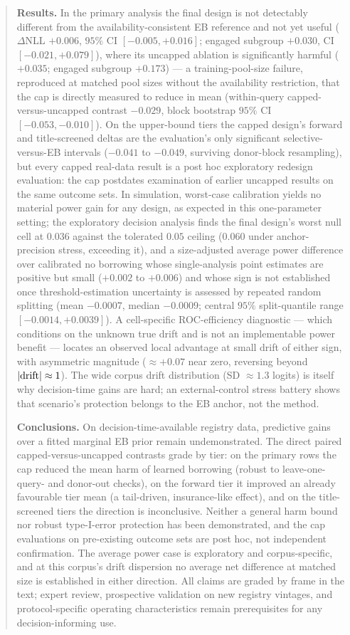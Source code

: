 \documentclass[11pt]{article}
\begin{document}
\begin{abstract}
\noindent\textbf{Results.} In the primary analysis the final design is
not detectably different from the availability-consistent EB reference
and not yet useful ($\Delta$NLL $+0.006$, $95\%$ CI
$[-0.005,+0.016]$; engaged subgroup $+0.030$, CI $[-0.021,+0.079]$),
where its uncapped ablation is significantly harmful ($+0.035$; engaged
subgroup $+0.173$) --- a training-pool-size failure, reproduced at
matched pool sizes without the availability restriction, that the cap is
directly measured to reduce in mean (within-query capped-versus-uncapped
contrast $-0.029$, block bootstrap $95\%$ CI $[-0.053,-0.010]$). On the upper-bound tiers the capped design's
forward and title-screened deltas are the evaluation's only significant
selective-versus-EB intervals ($-0.041$ to $-0.049$, surviving
donor-block resampling), but every capped real-data result is a post hoc
exploratory redesign evaluation: the cap postdates examination of earlier
uncapped results on the same outcome sets. In simulation, worst-case
calibration yields no material power gain for any design, as expected in
this one-parameter setting; the exploratory decision analysis finds the
final design's worst null cell at $0.036$ against the tolerated $0.05$
ceiling ($0.060$ under anchor-precision stress, exceeding it), and a
size-adjusted average power difference over calibrated no borrowing whose
single-analysis point estimates are positive but small ($+0.002$ to
$+0.006$) and whose sign is not established once threshold-estimation
uncertainty is assessed by repeated random splitting (mean $-0.0007$,
median $-0.0009$; central $95\%$ split-quantile range
$[-0.0014,+0.0039]$). A cell-specific ROC-efficiency
diagnostic --- which conditions on the unknown true drift and is not an
implementable power benefit --- locates an observed local advantage at
small drift of either sign, with asymmetric magnitude ($\approx +0.07$
near zero, reversing beyond $|{\rm drift}| \approx 1$). The wide corpus
drift distribution (SD $\approx 1.3$ logits) is itself why decision-time
gains are hard; an external-control stress battery shows that scenario's
protection belongs to the EB anchor, not the method.

\noindent\textbf{Conclusions.} On decision-time-available registry data,
predictive gains over a fitted marginal EB prior remain undemonstrated.
The direct paired capped-versus-uncapped contrasts grade by tier: on the
primary rows the cap reduced the mean harm of learned borrowing (robust
to leave-one-query- and donor-out checks), on the
forward tier it improved an already favourable tier mean (a tail-driven,
insurance-like effect), and on
the title-screened tiers the direction is inconclusive.
Neither a general harm bound nor robust type-I-error protection has been
demonstrated, and the cap evaluations on pre-existing outcome sets are
post hoc, not independent confirmation. The average power case is
exploratory and corpus-specific, and at this corpus's drift dispersion no
average net difference at matched size is established in either
direction. All claims are graded by frame in the text; expert review,
prospective validation on new registry vintages, and protocol-specific
operating characteristics remain prerequisites for any decision-informing
use.


\end{abstract}
\end{document}
